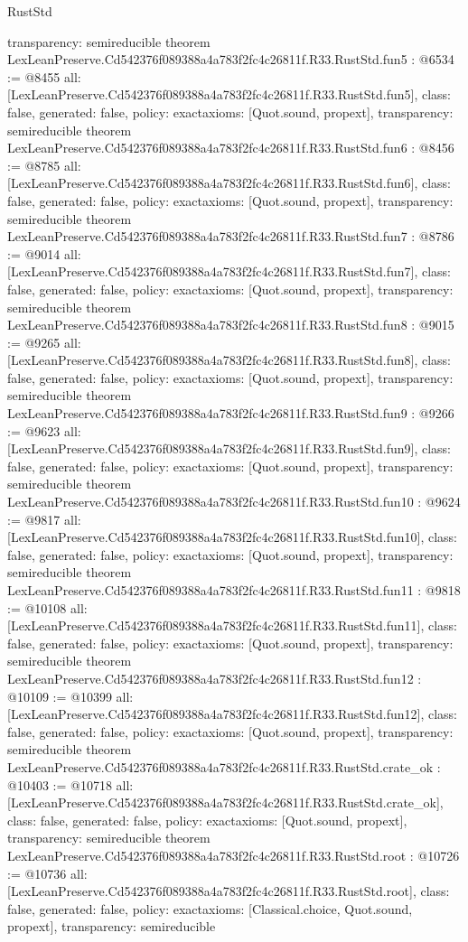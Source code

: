 \begin{lexlean}{RustStd}
\begin{coremodule}
{  transparency: semireducible
}
theorem LexLeanPreserve.Cd542376f089388a4a783f2fc4c26811f.R33.RustStd.fun5 : @6534 := @8455 {
  all: [LexLeanPreserve.Cd542376f089388a4a783f2fc4c26811f.R33.RustStd.fun5],
  class: false,
  generated: false,
  policy: exact{axioms: [Quot.sound, propext]},
  transparency: semireducible
}
theorem LexLeanPreserve.Cd542376f089388a4a783f2fc4c26811f.R33.RustStd.fun6 : @8456 := @8785 {
  all: [LexLeanPreserve.Cd542376f089388a4a783f2fc4c26811f.R33.RustStd.fun6],
  class: false,
  generated: false,
  policy: exact{axioms: [Quot.sound, propext]},
  transparency: semireducible
}
theorem LexLeanPreserve.Cd542376f089388a4a783f2fc4c26811f.R33.RustStd.fun7 : @8786 := @9014 {
  all: [LexLeanPreserve.Cd542376f089388a4a783f2fc4c26811f.R33.RustStd.fun7],
  class: false,
  generated: false,
  policy: exact{axioms: [Quot.sound, propext]},
  transparency: semireducible
}
theorem LexLeanPreserve.Cd542376f089388a4a783f2fc4c26811f.R33.RustStd.fun8 : @9015 := @9265 {
  all: [LexLeanPreserve.Cd542376f089388a4a783f2fc4c26811f.R33.RustStd.fun8],
  class: false,
  generated: false,
  policy: exact{axioms: [Quot.sound, propext]},
  transparency: semireducible
}
theorem LexLeanPreserve.Cd542376f089388a4a783f2fc4c26811f.R33.RustStd.fun9 : @9266 := @9623 {
  all: [LexLeanPreserve.Cd542376f089388a4a783f2fc4c26811f.R33.RustStd.fun9],
  class: false,
  generated: false,
  policy: exact{axioms: [Quot.sound, propext]},
  transparency: semireducible
}
theorem LexLeanPreserve.Cd542376f089388a4a783f2fc4c26811f.R33.RustStd.fun10 : @9624 := @9817 {
  all: [LexLeanPreserve.Cd542376f089388a4a783f2fc4c26811f.R33.RustStd.fun10],
  class: false,
  generated: false,
  policy: exact{axioms: [Quot.sound, propext]},
  transparency: semireducible
}
theorem LexLeanPreserve.Cd542376f089388a4a783f2fc4c26811f.R33.RustStd.fun11 : @9818 := @10108 {
  all: [LexLeanPreserve.Cd542376f089388a4a783f2fc4c26811f.R33.RustStd.fun11],
  class: false,
  generated: false,
  policy: exact{axioms: [Quot.sound, propext]},
  transparency: semireducible
}
theorem LexLeanPreserve.Cd542376f089388a4a783f2fc4c26811f.R33.RustStd.fun12 : @10109 := @10399 {
  all: [LexLeanPreserve.Cd542376f089388a4a783f2fc4c26811f.R33.RustStd.fun12],
  class: false,
  generated: false,
  policy: exact{axioms: [Quot.sound, propext]},
  transparency: semireducible
}
theorem LexLeanPreserve.Cd542376f089388a4a783f2fc4c26811f.R33.RustStd.crate_ok : @10403 := @10718 {
  all: [LexLeanPreserve.Cd542376f089388a4a783f2fc4c26811f.R33.RustStd.crate_ok],
  class: false,
  generated: false,
  policy: exact{axioms: [Quot.sound, propext]},
  transparency: semireducible
}
theorem LexLeanPreserve.Cd542376f089388a4a783f2fc4c26811f.R33.RustStd.root : @10726 := @10736 {
  all: [LexLeanPreserve.Cd542376f089388a4a783f2fc4c26811f.R33.RustStd.root],
  class: false,
  generated: false,
  policy: exact{axioms: [Classical.choice, Quot.sound, propext]},
  transparency: semireducible
}


\end{coremodule}
\end{lexlean}
